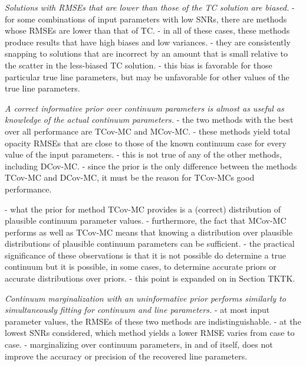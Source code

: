 \documentclass[trackchanges]{aastex62}
\begin{document}
{\emph{Solutions with RMSEs that are lower than those of the TC solution are biased.}
- for some combinations of input parameters with low SNRs, there are methods whose RMSEs are lower than that of TC.
- in all of these cases, these methods produce results that have high biases and low variances.
- they are consistently snapping to solutions that are incorrect by an amount that is small relative to the scatter in the less-biased TC solution.
- this bias is favorable for those particular true line parameters, but may be unfavorable for other values of the true line parameters.

\emph{A correct informative prior over continuum parameters is almost as useful as knowledge of the actual continuum parameters.}
- the two methods with the best over all performance are TCov-MC and MCov-MC.
- these methods yield total opacity RMSEs that are close to those of the known continuum case for every value of the input parameters.
- this is not true of any of the other methods, including DCov-MC.
- since the prior is the only difference between the methods TCov-MC and DCov-MC, it must be the reason for TCov-MCs good performance.

- what the prior for method TCov-MC provides is a (correct) distribution of plausible continuum parameter values.
- furthermore, the fact that MCov-MC performs as well as TCov-MC means that knowing a distribution over plausible distributions of plausible continuum parameters can be sufficient.
- the practical significance of these observations is that it is not possible do determine a true continuum but it is possible, in some cases, to determine accurate priors or accurate distributions over priors.
- this point is expanded on in Section TKTK.


\emph{Continuum marginalization with an uninformative prior performs similarly to simultaneously fitting for continuum and line parameters.}
- at most input parameter values, the RMSEs of these two methods are indistinguishable.
- at the lowest SNRs considered, which method yields a lower RMSE varies from case to case.
- marginalizing over continuum parameters, in and of itself, does not improve the accuracy or precision of the recovered line parameters.

}
\end{document}
